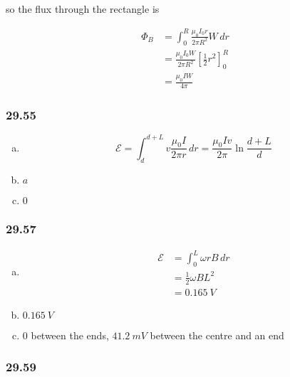\documentclass{article}
\begin{document}
so the flux through the rectangle is

\begin{align*}
  \Phi_B & = \int_0^R \frac{\mu_0 I_0 r}{2 \pi R^2} W \,dr                    \\
         & = \frac{\mu_0 I_0 W}{2 \pi R^2} \left[ \frac{1}{2} r^2 \right]_0^R \\
         & = \frac{\mu_0 I W}{4 \pi}
\end{align*}

\subsubsection{29.55}

\begin{enumerate}[(a)]
  \item \[\mathcal{E} = \int_d^{d + L} v \frac{\mu_0 I}{2 \pi r} \,dr = \frac{\mu_0 I v}{2 \pi} \ln \frac{d + L}{d}\]

  \item $a$

  \item $0$
\end{enumerate}

\subsubsection{29.57}

\begin{enumerate}[(a)]
  \item

        \begin{align*}
          \mathcal{E} & = \int_0^L \omega r B \,dr \\
                      & = \frac{1}{2} \omega B L^2 \\
                      & = \qty{0.165}{V}
        \end{align*}

  \item $\qty{0.165}{V}$

  \item $0$ between the ends, $\qty{41.2}{mV}$ between the centre and an end
\end{enumerate}

\subsubsection{29.59}
\end{document}
